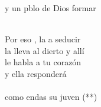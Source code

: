 \begin{cancion}
	y un pblo de Dios formar  \\\jump\\
	\begin{chorus}%
	Por eso , la  a seducir\\
	la lleva al dierto y allí\\
	le habla a tu corazón \\
	y ella  responderá\\
{}\vspace*{-0.4cm}\\
	como endas  su juven (**)\\
	\end{chorus}%
	\jump\\
\end{cancion}%
